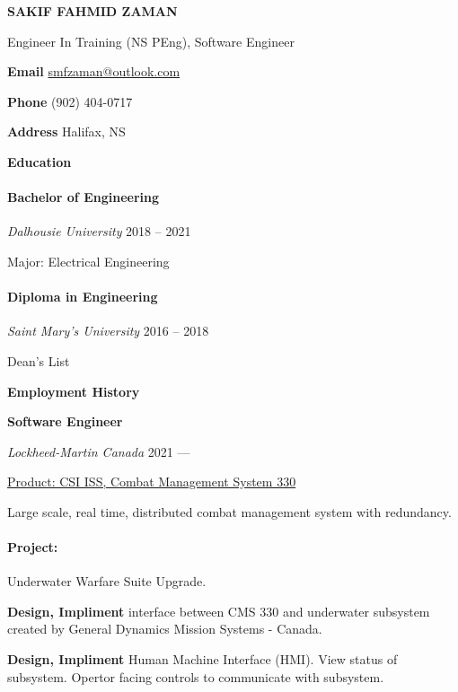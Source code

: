 \documentclass[12pt %
]{article}
\newcommand{\cvsection}[1] {
  \begin{center}
    \large\color{draculapurple}\textbf{#1}
  \end{center}
}
\begin{document}
\begin{center}
  \color{draculapurple}\textbf{\huge SAKIF FAHMID ZAMAN}

  Engineer In Training (NS PEng), Software Engineer
\end{center}



\begin{multicols}{3}
\textbf{Email} \hfill \href{mailto:smfzaman@outlook.com}{smfzaman@outlook.com}

\textbf{Phone} \hfill (902) 404-0717

\textbf{Address} \hfill Halifax, NS

\end{multicols}

\cvsection{Education}
\paragraph{Bachelor of Engineering} \emph{Dalhousie University} \hfill 2018 -- 2021

Major: Electrical Engineering

\paragraph{Diploma in Engineering} \emph{Saint Mary's University} \hfill 2016 -- 2018

Dean's List

\cvsection{Employment History}

\textbf{\color{draculapurple}Software Engineer}

\emph{Lockheed-Martin Canada} \hfill 2021 ---

\underline{Product: CSI ISS, Combat Management System 330}

Large scale, real time, distributed combat management system with redundancy.

\paragraph{Project:} Underwater Warfare Suite Upgrade.

\textbf{Design, Impliment} interface between CMS 330 and underwater subsystem created by General Dynamics Mission Systems - Canada.

\textbf{Design, Impliment} Human Machine Interface (HMI). View status of subsystem. Opertor facing controls to communicate with subsystem.
\end{document}
